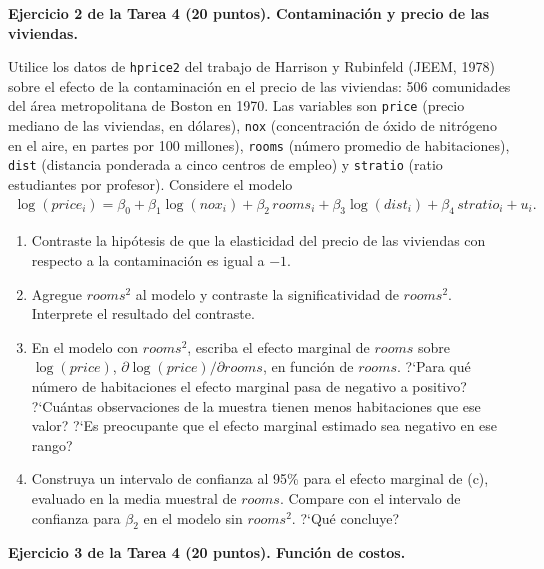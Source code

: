\documentclass[letterpaper,11pt]{article}
\begin{document}
\vspace{1em}

\noindent\textbf{Ejercicio 2 de la Tarea 4 (20 puntos). Contaminación y precio de las viviendas.}

Utilice los datos de \texttt{hprice2} del trabajo de Harrison y Rubinfeld
(JEEM, 1978) sobre el efecto de la contaminaci\'on en el precio de las viviendas: 506
comunidades del \'area metropolitana de Boston en 1970. Las variables son \texttt{price}
(precio mediano de las viviendas, en d\'olares), \texttt{nox} (concentraci\'on de \'oxido de
nitr\'ogeno en el aire, en partes por 100 millones), \texttt{rooms} (n\'umero promedio de
habitaciones), \texttt{dist} (distancia ponderada a cinco centros de empleo) y
\texttt{stratio} (ratio estudiantes por profesor). Considere el modelo
\begin{align*}
\log(price_i)=\beta_0+\beta_1 \log(nox_i)+\beta_2\, rooms_i +\beta_3 \log(dist_i) +\beta_4\, stratio_i +u_i.
\end{align*}
\begin{enumerate}
    \item Contraste la hip\'otesis de que la elasticidad del precio de las
        viviendas con respecto a la contaminaci\'on es igual a $-1$.
    \item Agregue $rooms^2$ al modelo y contraste la significatividad de
        $rooms^2$. Interprete el resultado del contraste.
    \item En el modelo con $rooms^2$, escriba el efecto marginal de $rooms$
        sobre $\log(price)$, $\partial\log(price)/\allowbreak\partial rooms$, en funci\'on de $rooms$. ?`Para qu\'e
        n\'umero de habitaciones el efecto marginal pasa de negativo a positivo? ?`Cu\'antas
        observaciones de la muestra tienen menos habitaciones que ese valor? ?`Es
        preocupante que el efecto marginal estimado sea negativo en ese rango?
    \item Construya un intervalo de confianza al 95\% para el efecto marginal
        de (c), evaluado en la media muestral de $rooms$. Compare con
        el intervalo de confianza para $\beta_2$ en el modelo sin $rooms^2$. ?`Qu\'e
        concluye?
\end{enumerate}

\vspace{1em}

\noindent\textbf{Ejercicio 3 de la Tarea 4 (20 puntos). Función de costos.}
\end{document}

